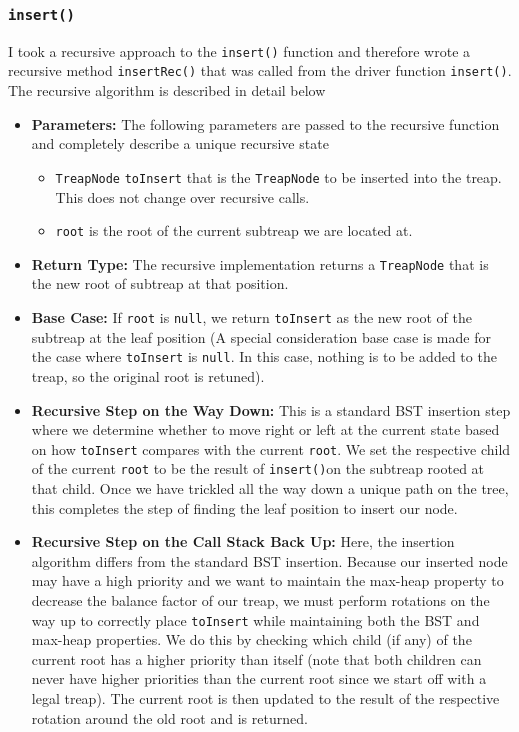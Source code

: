 \documentclass[11pt]{article}
\def\tt{\texttt}
\def\ins{\tt{insert()}}
\def\tn{\tt{TreapNode}}
\begin{document}
\subsubsection{\ins}
I took a recursive approach to the \ins{} function and therefore wrote a recursive method \tt{insertRec()} that was called from the driver function \ins. The recursive algorithm is described in detail below
\begin{itemize}
	\item \textbf{Parameters: } The following parameters are passed to the recursive function and completely describe a unique recursive state
	\begin{itemize}
		\item \tn{} \tt{toInsert} that is the \tn{} to be inserted into the treap. This does not change over recursive calls.
		\item \tt{root} is the root of the current subtreap we are located at. 
	\end{itemize}
	\item \textbf{Return Type: } The recursive implementation returns a \tn{} that is the new root of subtreap at that position.
	\item \textbf{Base Case: } If \tt{root} is \tt{null}, we return \tt{toInsert} as the new root of the subtreap at the leaf position (A special consideration base case is made for the case where \tt{toInsert} is \tt{null}. In this case, nothing is to be added to the treap, so the original root is retuned).
	\item \textbf{Recursive Step on the Way Down: } This is a standard BST insertion step where we determine whether to move right or left at the current state based on how \tt{toInsert} compares with the current \tt{root}. We set the respective child of the current \tt{root} to be the result of \ins on the subtreap rooted at that child. Once we have trickled all the way down a unique path on the tree, this completes the step of finding the leaf position to insert our node. 
	\item \textbf{Recursive Step on the Call Stack Back Up: } Here, the insertion algorithm differs from the standard BST insertion. Because our inserted node may have a high priority and we want to maintain the max-heap property to decrease the balance factor of our treap, we must perform rotations on the way up to correctly place \tt{toInsert} while maintaining both the BST and max-heap properties. We do this by checking which child (if any) of the current root has a higher priority than itself (note that both children can never have higher priorities than the current root since we start off with a legal treap). The current root is then updated to the result of the respective rotation around the old root and is returned. 
\end{itemize}
\end{document}
